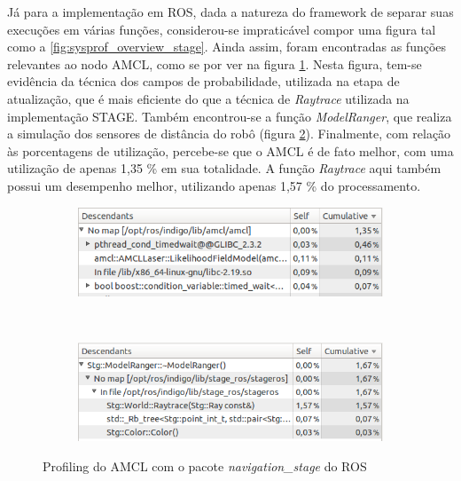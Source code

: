 \documentclass[
	12pt,				%
	openright,			%
	oneside,			%
	a4paper,			%
	english,			%
	french,				%
	spanish,			%
	brazil,				%
	]{abntex2}
\begin{document}
Já para a implementação em ROS, dada a natureza do framework de separar suas execuções em várias funções, considerou-se impraticável compor uma figura tal como a \ref{fig:sysprof_overview_stage}. Ainda assim, foram encontradas as funções relevantes ao nodo AMCL, como se por ver na figura \ref{fig:sysprof_amcl}. Nesta figura, tem-se evidência da técnica dos campos de probabilidade, utilizada na etapa de atualização, que é mais eficiente do que a técnica de \emph{Raytrace} utilizada na implementação STAGE. Também encontrou-se a função \emph{ModelRanger}, que realiza a simulação dos sensores de distância do robô (figura \ref{fig:sysprof_ranger_amcl}). Finalmente, com relação às porcentagens de utilização, percebe-se que o AMCL é de fato melhor, com uma utilização de apenas 1,35 \% em sua totalidade. A função \emph{Raytrace} aqui também possui um desempenho melhor, utilizando apenas 1,57 \% do processamento.

\begin{figure}[h!]
    \centering
    \begin{subfigure}[b]{0.6\linewidth}
        \includegraphics[width=\linewidth]{figs/sysprof_amcl}
        \caption{}
        \label{fig:sysprof_amcl}
    \end{subfigure}
    ~ %
    \begin{subfigure}[b]{0.6\linewidth}
        \includegraphics[width=\linewidth]{figs/sysprof_ranger_amcl}
        \caption{}
        \label{fig:sysprof_ranger_amcl}
    \end{subfigure}
    \caption{Profiling do AMCL com o pacote \emph{navigation\_stage} do ROS}
    \label{fig:sysprof_impl_amcl}
\end{figure}
\end{document}
